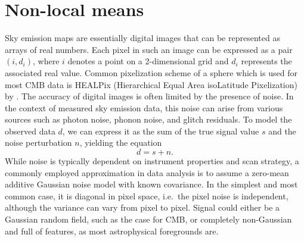 \documentclass{aa}
\begin{document}
\section{Non-local means}
\label{sec:nlmean}

Sky emission maps are essentially digital images that can be represented as arrays of real numbers. Each pixel in such an image can be expressed as a pair $(i, d_{i})$, where $i$ denotes a point on a 2-dimensional grid and $d_i$ represents the associated real value. Common pixelization scheme of a sphere which is used for most CMB data is HEALPix (Hierarchical Equal Area isoLatitude Pixelization) by \cite{2005ApJ...622..759G}. The accuracy of digital images is often limited by the presence of noise. In the context of measured sky emission data, this noise can arise from various sources such as photon noise, phonon noise, and glitch residuals. To model the observed data $d$, we can express it as the sum of the true signal value $s$ and the noise perturbation $n$, yielding the equation
%
\begin{equation}
  d = s + n .
\end{equation}
%
While noise is typically dependent on instrument properties and scan strategy, a commonly employed approximation in data analysis is to assume a zero-mean additive Gaussian noise model with known covariance. In the simplest and most common case, it is diagonal in pixel space, i.e.\ the pixel noise is independent, although the variance can vary from pixel to pixel. Signal could either be a Gaussian random field, such as the case for CMB, or completely non-Gaussian and full of features, as most astrophysical foregrounds are.
\end{document}
